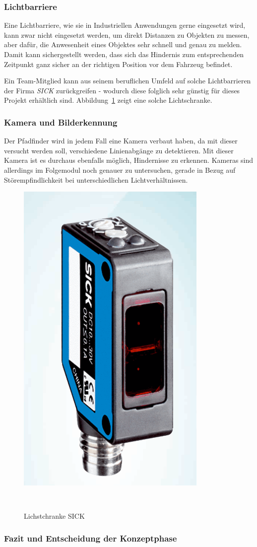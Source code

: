 \documentclass[main.tex]{subfiles} %
\begin{document}
\subsubsection*{Lichtbarriere}
Eine Lichtbarriere, wie sie in Industriellen Anwendungen gerne eingesetzt wird,
kann zwar nicht eingesetzt werden, um direkt Distanzen zu Objekten zu messen, aber dafür,
die Anwesenheit eines Objektes sehr schnell und genau zu melden. Damit kann sichergestellt werden, dass sich das Hindernis zum entsprechenden Zeitpunkt ganz sicher an der richtigen Position vor dem Fahrzeug befindet.

Ein Team-Mitglied kann aus seinem beruflichen Umfeld auf solche Lichtbarrieren
der Firma \textit{SICK} zurückgreifen - wodurch diese folglich sehr günstig für
dieses Projekt erhältlich sind. Abbildung~\ref{fig:SICK_Sensor} zeigt eine
solche Lichtschranke.

\subsubsection*{Kamera und Bilderkennung}
Der Pfadfinder wird in jedem Fall eine Kamera verbaut haben, da mit dieser
versucht werden soll, verschiedene Linienabgänge zu detektieren. Mit dieser Kamera
ist es durchaus ebenfalls möglich, Hindernisse zu erkennen. Kameras sind allerdings im Folgemodul noch
genauer zu untersuchen, gerade in Bezug auf Störempfindlichkeit bei unterschiedlichen Lichtverhältnissen.

\begin{figure}[h!]
    \centering
    \includegraphics[width=0.25\linewidth]{./fig_Hinderniserkennung/SICK_Lichtschranke.png}
    \caption{Lichstchranke SICK}~\label{fig:SICK_Sensor}
\end{figure}

\subsubsection*{Fazit und Entscheidung der Konzeptphase}
\end{document}
